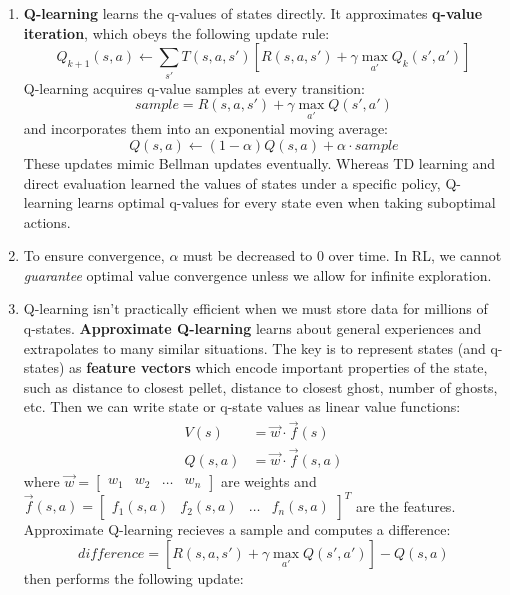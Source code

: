 \documentclass[10pt]{article}
\begin{document}
\begin{multicols}{2}
\begin{addmargin}[0.8em]{0.5em}
\begin{enumerate}[label=(\alph*)]
        $$\textit{sample}=R(s,\pi(s),s')+\gamma V^{\pi}(s')$$ and incorporate into the existing model for $V^{\pi}(s)$ with an \textbf{exponential moving average}: $$V^{\pi}(s) \leftarrow (1-\alpha)V^{\pi}(s)+\alpha \cdot \textit{sample}$$
        where $\alpha$ is the \textbf{learning rate}. It's typical to start out with $\alpha=1$ and slowly shrink it towards 0. The model for $V^{\pi}(s)$ only improves, so we see that older (thus less accurate) samples are given exponentially less weight. This method learns at every timestep, and converges to true state values much faster with fewer episodes than direct evaluation.
        \item \textbf{Q-learning} learns the q-values of states directly. It approximates \textbf{q-value iteration}, which obeys the following update rule:
        $$Q_{k+1}(s,a) \leftarrow \sum_{s'} T(s,a,s')[R(s,a,s')+\gamma \max_{a'}Q_k(s',a')]$$
        Q-learning acquires q-value samples at every transition:
        $$\textit{sample}=R(s,a,s')+\gamma\max_{a'} Q(s',a')$$ and incorporates them into an exponential moving average:
        $$Q(s,a) \leftarrow (1-\alpha)Q(s,a)+\alpha \cdot \textit{sample}$$ 
        These updates mimic Bellman updates eventually. Whereas TD learning and direct evaluation learned the values of states under a specific policy, Q-learning learns optimal q-values for every state even when taking suboptimal actions.
        \item To ensure convergence, $\alpha$ must be decreased to 0 over time. In RL, we cannot \textit{guarantee} optimal value convergence unless we allow for infinite exploration.
        \item Q-learning isn't practically efficient when we must store data for millions of q-states. \textbf{Approximate Q-learning} learns about general experiences and extrapolates to many similar situations. The key is to represent states (and q-states) as \textbf{feature vectors} which encode important properties of the state, such as distance to closest pellet, distance to closest ghost, number of ghosts, etc. Then we can write state or q-state values as linear value functions:
        \begin{align*}
            V(s)&=\vec{w} \cdot \vec{f}(s) \\
            Q(s,a)&= \vec{w} \cdot \vec{f}(s,a)
        \end{align*}
        where $\vec{w}=\begin{bmatrix} w_1 & w_2 & \hdots & w_n \end{bmatrix}$ are weights and $\vec{f}(s,a)=\begin{bmatrix} f_1(s,a) & f_2(s,a) & \hdots & f_n(s,a) \end{bmatrix}^T$ are the features. Approximate Q-learning recieves a sample and computes a difference: $$\textit{difference}= [R(s,a,s')+\gamma\max_{a'} Q(s',a')] - Q(s,a)$$ then performs the following update: 

\end{enumerate}
\end{addmargin}
\end{multicols}
\end{document}
